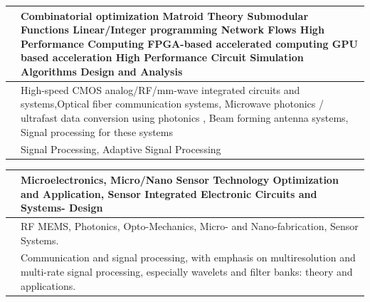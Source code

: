 \documentclass[openany]{book} %
\begin{document}
\begin{tabular}{p{4.5cm}p{9cm}}
\href{https://www.ee.iitb.ac.in/wiki/faculty/patkar}{\color{blue}{Prof. Sachin Patkar}} & Combinatorial optimization Matroid Theory Submodular Functions
Linear/Integer programming Network Flows High Performance Computing FPGA-based accelerated computing GPU based acceleration High Performance Circuit Simulation Algorithms Design and Analysis \\ 
 \hline 

\href{https://www.ee.iitb.ac.in/wiki/faculty/shalabh}{\color{blue}{Prof. Shalabh Gupta }} & High-speed CMOS analog/RF/mm-wave integrated circuits and systems,Optical fiber communication systems, Microwave photonics / ultrafast data  conversion using photonics , Beam forming antenna systems, Signal processing for these systems \\ 
\hline 

\href{https://www.ee.iitb.ac.in/wiki/faculty/merchant}{\color{blue}{Prof. Shabbir Merchant }} & Signal Processing, Adaptive Signal Processing\\ 
\hline 

\end{tabular}


\begin{tabular}{p{4.5cm} p{9cm}}

\hline
\href{https://www.ee.iitb.ac.in/web/people/faculty/home/sdgupta}{\color{blue}{Prof. Siddhartha P. Duttagupta }} & Microelectronics, Micro/Nano Sensor Technology Optimization and Application, Sensor Integrated Electronic Circuits and Systems- Design \\ 
\hline 

 \href{http://www.ee.iitb.ac.in/~stallur/index.php}{\color{blue}{Prof. Prof. Siddharth Tallur}} &  RF MEMS, Photonics, Opto-Mechanics, Micro- and Nano-fabrication, Sensor Systems.\\ 
\hline 

\href{https://www.ee.iitb.ac.in/wiki/faculty/vmgadre}{\color{blue}{Prof. Vikram M. Gadre}} & Communication and signal processing, with emphasis on multiresolution and multi-rate signal processing, especially wavelets and filter banks: theory and applications.\\ 
\hline 

\end{tabular}

\bigbreak
\end{document}
